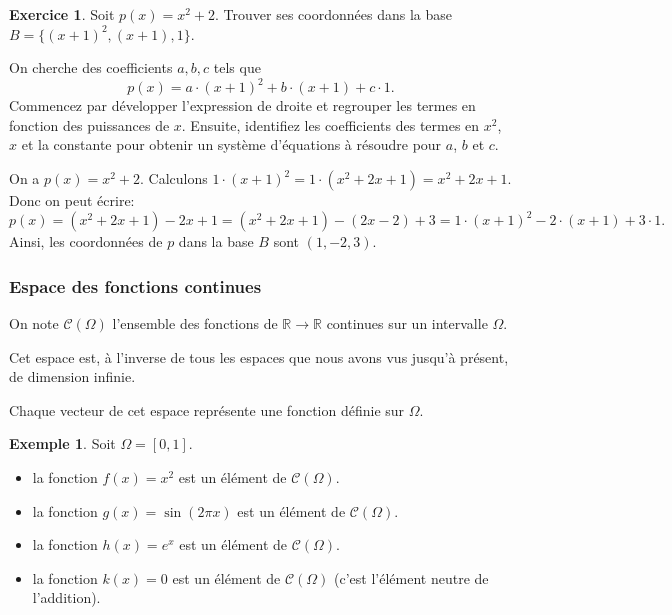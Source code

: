 \documentclass[11pt,a4paper]{article}
\numberwithin{equation}{section}
\theoremstyle{plain}
\theoremstyle{definition}
\newtheorem{example}[theorem]{Exemple}
\newtheorem{exercise}[theorem]{Exercice}
\theoremstyle{remark}
\newcommand{\R}{\mathbb{R}}
\begin{document}
\begin{exercise}
    Soit $p(x) = x^2 + 2$. Trouver ses coordonnées dans la base $B = \{(x+1)^2, (x+1), 1\}$.
\end{exercise}
\begin{indication}
    On cherche des coefficients $a,b,c$ tels que
    \[
        p(x) = a \cdot (x+1)^2 + b \cdot (x+1) + c \cdot 1.
    \]
    Commencez par développer l'expression de droite et regrouper les termes en fonction des puissances de $x$.
    Ensuite, identifiez les coefficients des termes en $x^2$, $x$ et la constante pour obtenir un système d'équations à résoudre pour $a$, $b$ et $c$.
\end{indication}
\begin{solution}
    On a $p(x) = x^2 + 2$.
    Calculons $1 \cdot (x+1)^2 = 1 \cdot (x^2 + 2x + 1) = x^2 + 2x + 1$.
    Donc on peut écrire:
    \[
        p(x) = (x^2 + 2x + 1) - 2x + 1 = (x^2 + 2x + 1) - (2x - 2) + 3 = 1 \cdot (x+1)^2 - 2 \cdot (x+1) + 3 \cdot 1.
    \]
    Ainsi, les coordonnées de $p$ dans la base $B$ sont $(1, -2, 3)$.
\end{solution}

\subsubsection{Espace des fonctions continues}

On note $\mathcal{C}(\Omega)$ l'ensemble des fonctions de $\R \to \R$ continues sur un intervalle $\Omega$.

Cet espace est, à l'inverse de tous les espaces que nous avons vus jusqu'à présent, de dimension infinie.

Chaque vecteur de cet espace représente une fonction définie sur $\Omega$.

\begin{example}
    Soit $\Omega = [0, 1]$.
    \begin{itemize}
        \item la fonction $f(x) = x^2$ est un élément de $\mathcal{C}(\Omega)$.
        \item la fonction $g(x) = \sin(2\pi x)$ est un élément de $\mathcal{C}(\Omega)$.
        \item la fonction $h(x) = e^x$ est un élément de $\mathcal{C}(\Omega)$.
        \item la fonction $k(x) = 0$ est un élément de $\mathcal{C}(\Omega)$ (c'est l'élément neutre de l'addition).
    \end{itemize}
\end{example}
\end{document}
